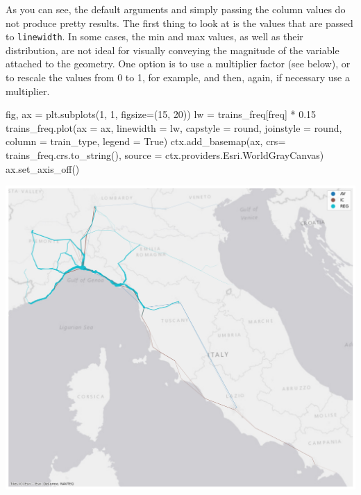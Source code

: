\documentclass[
  letterpaper,
  DIV=11,
  numbers=noendperiod]{scrreprt}
\newenvironment{Shaded}{\begin{snugshade}}{\end{snugshade}}
\newcommand{\DecValTok}[1]{\textcolor[rgb]{0.68,0.00,0.00}{#1}}
\newcommand{\FloatTok}[1]{\textcolor[rgb]{0.68,0.00,0.00}{#1}}
\newcommand{\NormalTok}[1]{\textcolor[rgb]{0.00,0.23,0.31}{#1}}
\newcommand{\OperatorTok}[1]{\textcolor[rgb]{0.37,0.37,0.37}{#1}}
\newcommand{\StringTok}[1]{\textcolor[rgb]{0.13,0.47,0.30}{#1}}
\newcommand{\VariableTok}[1]{\textcolor[rgb]{0.07,0.07,0.07}{#1}}
\begin{document}
As you can see, the default arguments and simply passing the column
values do not produce pretty results. The first thing to look at is the
values that are passed to \texttt{linewidth}. In some cases, the min and
max values, as well as their distribution, are not ideal for visually
conveying the magnitude of the variable attached to the geometry. One
option is to use a multiplier factor (see below), or to rescale the
values from 0 to 1, for example, and then, again, if necessary use a
multiplier.

\begin{Shaded}
\begin{Highlighting}[]
\NormalTok{fig, ax }\OperatorTok{=}\NormalTok{ plt.subplots(}\DecValTok{1}\NormalTok{, }\DecValTok{1}\NormalTok{, figsize}\OperatorTok{=}\NormalTok{(}\DecValTok{15}\NormalTok{, }\DecValTok{20}\NormalTok{))}
\NormalTok{lw }\OperatorTok{=}\NormalTok{ trains\_freq[}\StringTok{\textquotesingle{}freq\textquotesingle{}}\NormalTok{] }\OperatorTok{*} \FloatTok{0.15}
\NormalTok{trains\_freq.plot(ax }\OperatorTok{=}\NormalTok{ ax, linewidth }\OperatorTok{=}\NormalTok{ lw, capstyle }\OperatorTok{=} \StringTok{\textquotesingle{}round\textquotesingle{}}\NormalTok{, joinstyle }\OperatorTok{=} \StringTok{\textquotesingle{}round\textquotesingle{}}\NormalTok{, column }\OperatorTok{=} \StringTok{\textquotesingle{}train\_type\textquotesingle{}}\NormalTok{, legend }\OperatorTok{=} \VariableTok{True}\NormalTok{)}
\NormalTok{ctx.add\_basemap(ax, crs}\OperatorTok{=}\NormalTok{ trains\_freq.crs.to\_string(), source }\OperatorTok{=}\NormalTok{ ctx.providers.Esri.WorldGrayCanvas)}
\NormalTok{ax.set\_axis\_off()}
\end{Highlighting}
\end{Shaded}

\includegraphics{labs/w02_maps_files/figure-pdf/cell-56-output-1.png}
\end{document}
